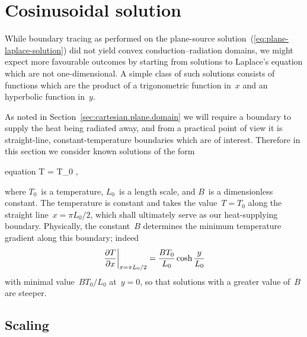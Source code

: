 \section{Cosinusoidal solution}
\label{sec:cartesian.cosine}

While boundary tracing as performed on
the plane-source solution~(\ref{eq:plane-laplace-solution})
did not yield convex conduction--radiation domains,
we might expect more favourable outcomes
by starting from solutions to Laplace's equation
which are not one-dimensional.
A simple class of such solutions consists of functions which are the product
of a trigonometric function in~$x$ and an hyperbolic function in~$y$.

As noted in Section~\ref{sec:cartesian.plane.domain}
we will require a boundary to supply the heat being radiated away,
and from a practical point of view it is
straight-line, constant-temperature boundaries which are of interest.
Therefore in this section we consider known solutions of the form
\begin{important}{equation}
  T = T_0 ,
  \label{eq:cosine-laplace-solution}
\end{important}
where $T_0$~is a temperature, $L_0$~is a length scale,
and $B$~is a dimensionless constant.
The temperature is constant and takes the value~$T = T_0$
along the straight line~$x = \pi L_0/2$,
which shall ultimately serve as our heat-supplying boundary.
Physically, the constant~$B$ determines
the minimum temperature gradient along this boundary;
indeed
\begin{equation}
  \eval*{\pder{T}{x}}_{x = \pi L_0/2} = \frac{B T_0}{L_0} \cosh\frac{y}{L_0}
  \label{eq:cosine-laplace-solution-dirichlet-slope}
\end{equation}
with minimal value~$B T_0 / L_0$ at~$y = 0$,
so that solutions with a greater value of~$B$ are steeper.

\subsection{Scaling}
\label{sec:cartesian.cosine.scaling}

